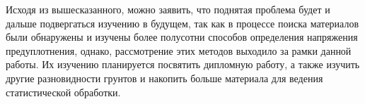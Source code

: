 Исходя из вышесказанного, можно заявить, что поднятая проблема будет и дальше подвергаться изучению в будущем, так как в процессе поиска материалов были обнаружены и изучены более полусотни способов определения напряжения предуплотнения, однако, рассмотрение этих методов выходило за рамки данной работы. 
Их изучению планируется посвятить дипломную работу, а также изучить другие разновидности грунтов и накопить больше материала для ведения статистической обработки.
